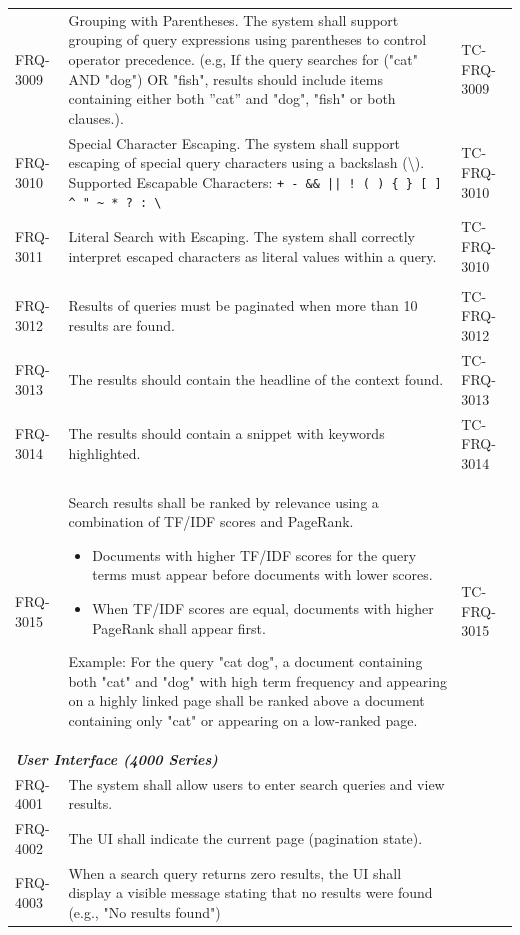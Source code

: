 \documentclass{article}
\begin{document}
\begin{longtable}{@{}p{1.7cm} p{9cm} p{4.5cm}@{}}
FRQ-3009 & Grouping with Parentheses. The system shall support grouping of query expressions using parentheses to control operator precedence. \newline
            (e.g, If the query searches for ("cat" AND "dog") OR "fish", results should include items containing either both ”cat” and "dog", "fish" or both clauses.). & TC-FRQ-3009\\


FRQ-3010 & Special Character Escaping. The system shall support escaping of special query characters using a backslash (\textbackslash). \newline
            Supported Escapable Characters: \newline \texttt{+ - \&\& || ! ( ) \{ \} [ ] \^{} " \textasciitilde{} * ? : \textbackslash} & TC-FRQ-3010 \\
FRQ-3011 & Literal Search with Escaping. The system shall correctly interpret escaped characters as literal values within a query. & TC-FRQ-3010 \\


                       & \\
FRQ-3012 & Results of queries must be paginated when more than 10 results are found. &  TC-FRQ-3012 \\
FRQ-3013 & The results should contain the headline of the context found. & TC-FRQ-3013\\
FRQ-3014 & The results should contain a snippet with keywords highlighted. & TC-FRQ-3014\\
FRQ-3015 & Search results shall be ranked by relevance using a combination of TF/IDF scores and PageRank. \newline
\begin{itemize}
 \item Documents with higher TF/IDF scores for the query terms must appear before documents with lower scores. 
 \item When TF/IDF scores are equal, documents with higher PageRank shall appear first. 
\end{itemize}


Example:    For the query "cat dog", a document containing both "cat" and "dog" with high term frequency 
            and appearing on a highly linked page shall be ranked above a document containing only "cat" 
            or appearing on a low-ranked page. &  TC-FRQ-3015 \\


\midrule
\multicolumn{3}{l}{\textbf{\textit{User Interface (4000 Series)}}} \\
\midrule
FRQ-4001 & The system shall allow users to enter search queries and view results. & \\
FRQ-4002 & The UI shall indicate the current page (pagination state). & \\
FRQ-4003 & When a search query returns zero results, the UI shall display a visible message stating 
            that no results were found (e.g., "No results found") & \\

\end{longtable}
\newpage
\end{document}
